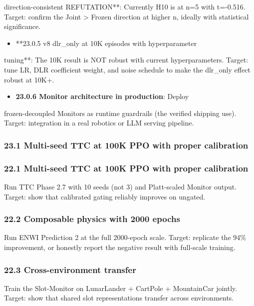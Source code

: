 \documentclass[11pt]{article}
\begin{document}
  direction-consistent REFUTATION**: Currently H10 is at n=5
  with t=-0.516. Target: confirm the Joint > Frozen direction
  at higher n, ideally with statistical significance.
\begin{itemize}
  \item **23.0.5 v8 dlr\_only at 10K episodes with hyperparameter
\end{itemize}

  tuning**: The 10K result is NOT robust with current
  hyperparameters. Target: tune LR, DLR coefficient weight,
  and noise schedule to make the dlr\_only effect robust at
  10K+.
\begin{itemize}
  \item \textbf{23.0.6 Monitor architecture in production}: Deploy
\end{itemize}

  frozen-decoupled Monitors as runtime guardrails (the
  verified shipping use). Target: integration in a real
  robotics or LLM serving pipeline.

\subsubsection{23.1 Multi-seed TTC at 100K PPO with proper calibration}

\subsubsection{22.1 Multi-seed TTC at 100K PPO with proper calibration}

Run TTC Phase 2.7 with 10 seeds (not 3) and Platt-scaled Monitor output. Target:
show that calibrated gating reliably improves on ungated.

\subsubsection{22.2 Composable physics with 2000 epochs}

Run ENWI Prediction 2 at the full 2000-epoch scale. Target: replicate the 94\%
improvement, or honestly report the negative result with full-scale training.

\subsubsection{22.3 Cross-environment transfer}

Train the Slot-Monitor on LunarLander + CartPole + MountainCar jointly. Target:
show that shared slot representations transfer across environments.
\end{document}
